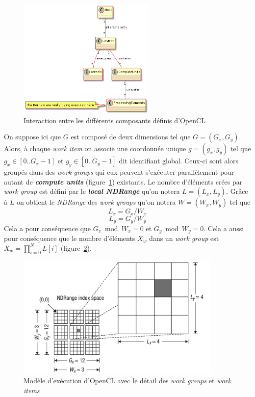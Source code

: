 \begin{figure}[h]
    \includegraphics[width=0.6\textwidth]{../../resources/host_device_relationship.png}
    \caption{Interaction entre les différents composants définis d'OpenCL}
    \label{fig:host_device_interaction}
\end{figure}

On suppose ici que $G$ est composé de deux dimensions tel que $G = (G_x, G_y)$.
Alors, à chaque \textit{work item} on associe une coordonnée unique $g = (g_x, g_y)$ tel que 
$g_x \in [0..G_x-1]$ et $g_y \in [0..G_y-1]$ dit identifiant global. 
Ceux-ci sont alors groupés dans des
\textit{work groups} qui eux peuvent s'exécuter parallèlement pour autant de 
\textbf{\textit{compute units}} (figure~\ref{fig:host_device_interaction}) existants. 
Le nombre d'éléments crées par \textit{work group} 
est défini par le \textbf{\textit{local NDRange}} qu'on notera $L = (L_x, L_y)$. 
Grâce à $L$ on obtient le \textit{NDRange} des \textit{work groups} qu'on notera $W = (W_x, W_y)$ 
tel que 
$$L_x = G_x / W_x$$ 
$$L_y = G_y / W_y$$ 
Cela a pour conséquence que $G_x \bmod W_x = 0$ et 
$G_y \bmod W_y = 0$. Cela a aussi pour conséquence que le nombre d'éléments $X_w$ dans 
un \textit{work group} est ${\displaystyle X_w = \prod_{i=0}^{N}L[i]}$ 
(figure~\ref{fig:execution_model}). 

\begin{figure}[h]
\begin{center}
    \includegraphics[width=0.9\textwidth]{../../resources/execution_model.png}
    \caption{Modèle d'exécution d'OpenCL avec le détail des \textit{work groups} 
    et \textit{work items}}
    \label{fig:execution_model}
\end{center}
\end{figure}

